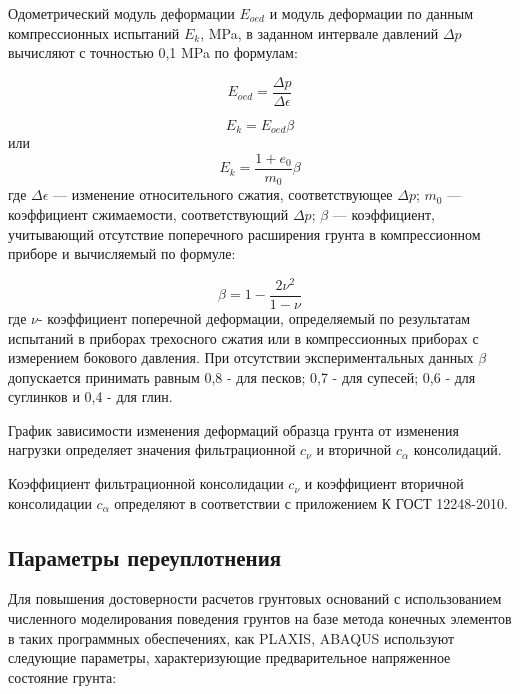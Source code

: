 Одометрический модуль деформации $E_{oed}$ и модуль деформации
по данным компрессионных испытаний $E_k$, \si{\mega\pascal}, в заданном интервале
давлений $\Delta p$ вычисляют с точностью 0,1 \si{\mega\pascal} по формулам:

\[
   E_{oed} = \frac{\Delta p}{\Delta \epsilon}
\]

\[
   E_k = E_{oed} \beta
\]
или
\[
   E_k = \frac{1+e_0}{m_0}\beta
\]
где $\Delta \epsilon$ --- изменение относительного сжатия, соответствующее $\Delta p$;
$m_0$ --- коэффициент сжимаемости, соответствующий $\Delta p$;
$\beta$ --- коэффициент, учитывающий отсутствие поперечного расширения
грунта в компрессионном приборе и вычисляемый по формуле:

\[
   \beta = 1-\frac{2\nu^2}{1-\nu}
\]
где $\nu$- коэффициент поперечной деформации, определяемый по результатам
испытаний в приборах трехосного сжатия или в компрессионных
приборах с измерением бокового давления.
При отсутствии экспериментальных данных $\beta$ допускается принимать
равным 0,8 - для песков; 0,7 - для супесей; 0,6 - для суглинков и 0,4 - для глин.

График зависимости изменения деформаций образца грунта 
от изменения нагрузки определяет значения фильтрационной $c_\nu$ 
и вторичной $c_\alpha$ консолидаций.

Коэффициент фильтрационной консолидации $c_\nu$ и коэффициент
вторичной консолидации $c_\alpha$ определяют в соответствии 
с приложением К ГОСТ 12248-2010.

%
%
%

\subsection{Параметры переуплотнения}

Для повышения достоверности расчетов грунтовых оснований 
с использованием численного моделирования поведения 
грунтов на базе метода конечных элементов в таких программных
обеспечениях, как PLAXIS, ABAQUS используют следующие 
параметры, характеризующие предварительное напряженное 
состояние грунта:

